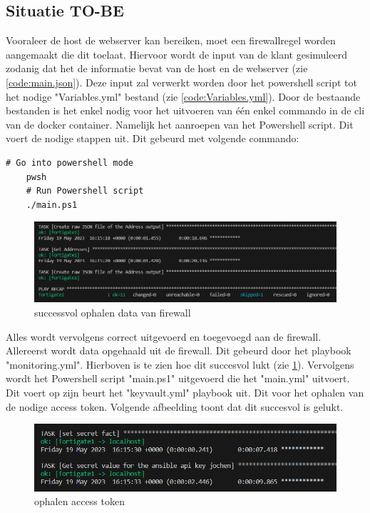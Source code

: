 \subsection{Situatie TO-BE}
Vooraleer de host de webserver kan bereiken, moet een firewallregel worden aangemaakt die dit toelaat. Hiervoor wordt de input van de klant gesimuleerd zodanig dat het de informatie bevat van de host en de webserver (zie \ref{code:main.json}). Deze input zal verwerkt worden door het powershell script tot het nodige "Variables.yml" bestand (zie \ref{code:Variables.yml}). Door de bestaande bestanden is het enkel nodig voor het uitvoeren van één enkel commando in de cli van de docker container. Namelijk het aanroepen van het Powershell script. Dit voert de nodige stappen uit. Dit gebeurd met volgende commando: 

\begin{lstlisting}[caption={commando uitvoeren Powershell script}]
    # Go into powershell mode 
    pwsh
    # Run Powershell script
    ./main.ps1
\end{lstlisting}

\begin{figure}[h]
    \centering
    \includegraphics[width=158mm]{bachproef/graphics/input_firewall.png} 
    \caption{successvol ophalen data van firewall}
    \label{fig:data_firewall}
\end{figure}
Alles wordt vervolgens correct uitgevoerd en toegevoegd aan de firewall. 
Allereerst wordt data opgehaald uit de firewall. Dit gebeurd door het playbook "monitoring.yml". Hierboven is te zien hoe dit succesvol lukt (zie \ref{fig:data_firewall}). 
\newpage
Vervolgens wordt het Powershell script "main.ps1" uitgevoerd die het "main.yml" uitvoert. Dit voert op zijn beurt het "keyvault.yml" playbook uit.
Dit voor het ophalen van de nodige access token. Volgende afbeelding toont dat dit succesvol is gelukt. 

\begin{figure}[h]
    \centering
    \includegraphics[width=158mm]{bachproef/graphics/keyvault.png} 
    \caption{ophalen access token}
    \label{fig:keyvault}
\end{figure}

